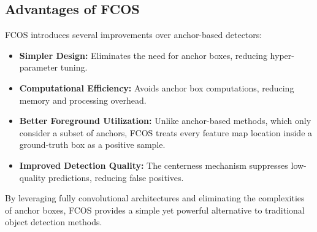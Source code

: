 \subsection{Advantages of FCOS}
FCOS introduces several improvements over anchor-based detectors:
\begin{itemize}
    \item \textbf{Simpler Design:} Eliminates the need for anchor boxes, reducing hyper-parameter tuning.
    \item \textbf{Computational Efficiency:} Avoids anchor box computations, reducing memory and processing overhead.
    \item \textbf{Better Foreground Utilization:} Unlike anchor-based methods, which only consider a subset of anchors, FCOS treats every feature map location inside a ground-truth box as a positive sample.
    \item \textbf{Improved Detection Quality:} The centerness mechanism suppresses low-quality predictions, reducing false positives.
\end{itemize}

By leveraging fully convolutional architectures and eliminating the complexities of anchor boxes, FCOS provides a simple yet powerful alternative to traditional object detection methods.

\newpage

